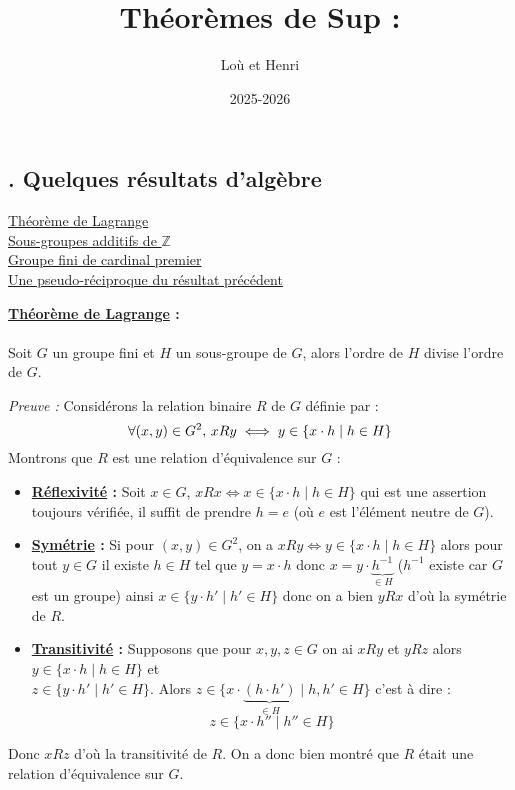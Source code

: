 \documentclass{article}
\title{\textbf{Théorèmes de Sup :}}
\author{Loù et Henri}
\date{2025-2026}
\begin{document}
\maketitle

\subsection{. \textbf{Quelques résultats d'algèbre}}

\hyperlink{page.2}{Théorème de Lagrange }\\
\hyperlink{page.3}{Sous-groupes additifs de $\mathbb{Z}$ }\\
\hyperlink{page.4}{Groupe fini de cardinal premier }\\
\hyperlink{page.4}{Une pseudo-réciproque du résultat précédent }\\


\newpage

\begin{tcolorbox}[colback=gray!10, colframe=black, boxrule=1.5pt, arc=0pt,
                  left=4pt, right=4pt, top=4pt, bottom=4pt,
                  leftrule=1.5pt, rightrule=0pt, toprule=0pt, bottomrule=0pt]
 \textbf{\underline{Théorème de Lagrange} :} \\
\\
 Soit $G$ un groupe fini et $H$ un sous-groupe de $G$, alors l'ordre de $H$ divise l'ordre de $G$.
\end{tcolorbox}

\textit{Preuve :} Considérons la relation binaire $R$ de $G$ définie par :
$$\forall (x,y) \in G^2, \thinspace xRy \iff y \in \{x \cdot h \mid h \in H \}$$
Montrons que $R$ est une relation d'équivalence sur $G$ :\\
\begin{itemize}

\item \textbf{\underline{Réflexivité} :} Soit $x \in G$, $xRx \iff x \in \{x \cdot h \mid h \in H\}$ qui est une assertion toujours vérifiée, il suffit de prendre $h = e$ 
(où $e$ est l'élément neutre de $G$).
\\
\item \textbf{\underline{Symétrie} :} Si pour $(x,y) \in G^2$, on a $xRy \iff y \in \{x \cdot h \mid h \in H \}$ alors pour tout 
$y \in G$ il existe $h \in H$ tel que $y = x \cdot h$ donc $x = y \cdot \underbrace{h^{-1}}_{\in H}$ ($h^{-1}$ existe car $G$ est un groupe) ainsi $x \in \{y \cdot h' \mid h' \in H \}$
donc on a bien $yRx$ d'où la symétrie de $R$.
\\
\item \textbf{\underline{Transitivité} :} Supposons que pour $x,y,z \in G$ on ai $xRy$ et $yRz$ alors $y \in \{x \cdot h \mid h \in H \}$ et \\
$z \in \{y \cdot h' \mid h' \in H \}$. Alors $z \in \{x \cdot \underbrace{(h \cdot h')}_{\in H} \mid h,h' \in H \}$ c'est à dire :
$$z \in \{x \cdot h'' \mid h'' \in H \}$$
\end{itemize}
Donc $xRz$ d'où la transitivité de $R$. On a donc bien montré que $R$ était une relation d'équivalence sur $G$.\\
\end{document}
